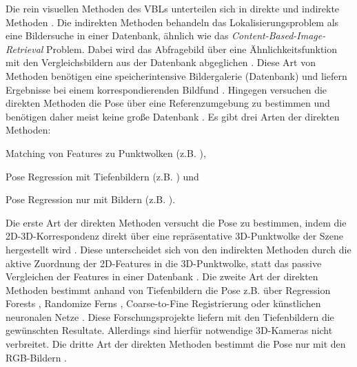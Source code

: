 Die rein visuellen Methoden des VBLs unterteilen sich in direkte und indirekte Methoden \cite{lowryVisualPlaceRecognition2016}. Die indirekten Methoden behandeln das Lokalisierungsproblem als eine Bildersuche in einer Datenbank, ähnlich wie das \textit{Content-Based-Image-Retrieval} \cite{lewContentbasedMultimediaInformation2006} Problem. Dabei wird das Abfragebild über eine Ähnlichkeitsfunktion mit den Vergleichsbildern aus der Datenbank abgeglichen \cite{zhangImageBasedLocalization2006}. Diese Art von Methoden benötigen eine speicherintensive Bildergalerie (Datenbank) und liefern Ergebnisse bei einem korrespondierenden Bildfund \cite{lowryVisualPlaceRecognition2016}. Hingegen versuchen die direkten Methoden die Pose über eine Referenzumgebung zu bestimmen und benötigen daher meist keine große Datenbank \cite{piascoSurveyVisualBasedLocalization2018}. Es gibt drei Arten der direkten Methoden: 
\begin{enumerate*}[label=\arabic*)]
	\item Matching von Features zu Punktwolken (z.B. \cite{liWorldwidePoseEstimation2012}),
	\item Pose Regression mit Tiefenbildern (z.B. \cite{shottonSceneCoordinateRegression2013}) und
	\item Pose Regression nur mit Bildern (z.B. \cite{kendallPoseNetConvolutionalNetwork2015}).
\end{enumerate*}

Die erste Art der direkten Methoden versucht die Pose zu bestimmen, indem die 2D-3D-Korrespondenz direkt über eine repräsentative 3D-Punktwolke der Szene hergestellt wird \cite{piascoSurveyVisualBasedLocalization2018}. Diese unterscheidet sich von den indirekten Methoden durch die aktive Zuordnung der 2D-Features in die 3D-Punktwolke, statt das passive Vergleichen der Features in einer Datenbank \cite{irscharaStructurefrommotionPointClouds2009}. Die zweite Art der direkten Methoden bestimmt anhand von Tiefenbildern die Pose z.B. über Regression Forests \cite{shottonSceneCoordinateRegression2013}, Randomize Ferns \cite{glockerRealTimeRGBDCamera2015}, Coarse-to-Fine Registrierung \cite{santosMappingIndoorSpaces2016} oder künstlichen neuronalen Netze \cite{massicetiRandomForestsNeural2017}. Diese Forschungsprojekte liefern mit den Tiefenbildern die gewünschten Resultate. Allerdings sind hierfür notwendige 3D-Kameras nicht verbreitet. Die dritte Art der direkten Methoden bestimmt die Pose nur mit den RGB-Bildern \cite{kendallPoseNetConvolutionalNetwork2015}.

